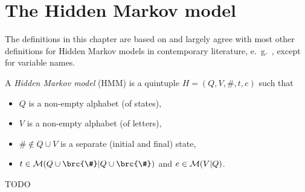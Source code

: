 \chapter{The Hidden Markov model}

The definitions in this chapter are based on \cite{vogler2015} and largely
agree with most other definitions for Hidden Markov models in contemporary
literature, e.~g.~\cite[pp.~210]{jm09}, except for variable names.

\begin{definition}
 A \emph{Hidden Markov model} (HMM) is a quintuple $H = (Q,V,\#,t,e)$ such that
 \begin{itemize}\setlength\itemsep{-0.3em}
  \item $Q$ is a non-empty alphabet (of states),
  \item $V$ is a non-empty alphabet (of letters),
  \item $\#\notin Q\cup V$ is a separate (initial and final) state,
  \item $t\in\um(Q\cup\brc{\#}|Q\cup\brc{\#})$ and $e\in\mathcal M(V|Q)$.
 \end{itemize}
\end{definition}

{\color{red}TODO}
